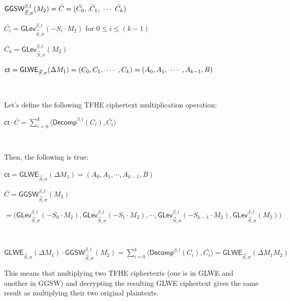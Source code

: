 $\textsf{GGSW}_{\vec{S}, \sigma}^{\beta, l}(M_2) = {\bar{C}} = (\bar{C_0},. \bar{C_1}, \text{ } \text{$\cdots$} \text{ } \bar{C_k})$ 

$\bar{C_i} = \textsf{GLev}_{\vec{S}, \sigma}^{\beta, l}(-S_i \cdot M_2)$ for $0 \leq i \leq (k-1)$

$\bar{C_k} = \textsf{GLev}_{\vec{S}, \sigma}^{\beta, l}(M_2)$

$\textsf{ct} = \textsf{GLWE}_{\vec{S}, \sigma}(\Delta M_1) = (C_0, C_1, \text{ } \text{$\cdots$} \text{ }, C_k) = (A_0, A_1, \text{ } \text{$\cdots$} \text{ }, A_{k-1}, B)$

$ $

\noindent Let's define the following TFHE ciphertext multiplication operation: 

$\textsf{ct} \cdot {\bar{C}} = \sum\limits_{i=0}^{k}\langle \textsf{Decomp}^{\beta, l}(C_i), \bar{C_i} \rangle$

$ $

\noindent Then, the following is true:

\begin{tcolorbox}[title={\textbf{\tboxlabel{\ref*{subsubsec:tfhe-glwe-to-ggsw-multiplication}} Generalization to GLWE-to-GGSW Multiplication}}]
$\textsf{ct} = \textsf{GLWE}_{\vec{S}, \sigma}(\Delta M_1) = (A_0, A_1, \cdots, A_{k-1}, B)$

$\bar{C} = \textsf{GGSW}_{\vec{S}, \sigma}^{\beta, l}(M_2)$

$ = \bm(\textsf{GLev}_{\vec{S}, \sigma}^{\beta, l}(-S_0\cdot M_2), \textsf{GLev}_{\vec{S}, \sigma}^{\beta, l}(-S_1\cdot M_2), \cdots, \textsf{GLev}_{\vec{S}, \sigma}^{\beta, l}(-S_{k-1}\cdot M_2), \textsf{GLev}_{\vec{S}, \sigma}^{\beta, l}(M_2)\bm)$

$ $

$\textsf{GLWE}_{\vec{S}, \sigma}(\Delta M_1) \cdot \textsf{GGSW}_{\vec{S}, \sigma}^{\beta, l}(M_2) = \sum\limits_{i=0}^{k}\langle \textsf{Decomp}^{\beta, l}(C_i), \bar{C_i} \rangle = \textsf{GLWE}_{\vec{S}, \sigma}(\Delta M_1 M_2)$
\end{tcolorbox}

This means that multiplying two TFHE ciphertexts (one is in GLWE and another in GGSW) and decrypting the resulting GLWE ciphertext gives the same result as multiplying their two original plaintexts. 


